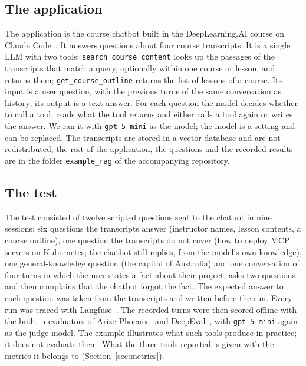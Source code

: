 \documentclass[conference]{IEEEtran}
\begin{document}
\subsection{The application}
The application is the course chatbot built in the DeepLearning.AI course on Claude Code~\cite{course_claude_code}. It answers questions about four course transcripts. It is a single LLM with two tools: \texttt{search\_\allowbreak course\_\allowbreak content} looks up the passages of the transcripts that match a query, optionally within one course or lesson, and returns them; \texttt{get\_\allowbreak course\_\allowbreak outline} returns the list of lessons of a course. Its input is a user question, with the previous turns of the same conversation as history; its output is a text answer. For each question the model decides whether to call a tool, reads what the tool returns and either calls a tool again or writes the answer. We ran it with \texttt{gpt-5-mini} as the model; the model is a setting and can be replaced. The transcripts are stored in a vector database and are not redistributed; the rest of the application, the questions and the recorded results are in the folder \texttt{example\_rag} of the accompanying repository.

\subsection{The test}
The test consisted of twelve scripted questions sent to the chatbot in nine sessions: six questions the transcripts answer (instructor names, lesson contents, a course outline), one question the transcripts do not cover (how to deploy MCP servers on Kubernetes; the chatbot still replies, from the model's own knowledge), one general-knowledge question (the capital of Australia) and one conversation of four turns in which the user states a fact about their project, asks two questions and then complains that the chatbot forgot the fact. The expected answer to each question was taken from the transcripts and written before the run. Every run was traced with Langfuse~\cite{tool_langfuse}. The recorded turns were then scored offline with the built-in evaluators of Arize Phoenix~\cite{tool_arize_phoenix} and DeepEval~\cite{tool_deepeval}, with \texttt{gpt-5-mini} again as the judge model. The example illustrates what such tools produce in practice; it does not evaluate them. What the three tools reported is given with the metrics it belongs to (Section~\ref{sec:metrics}).
\end{document}
